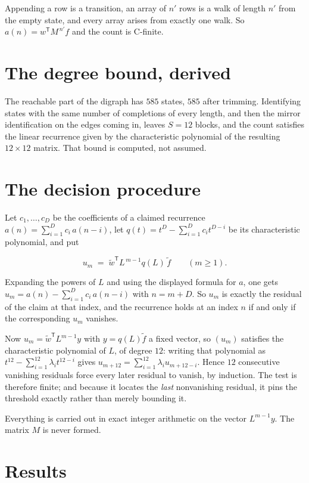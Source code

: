 \documentclass[11pt]{article}
\theoremstyle{definition}
\begin{document}
Appending a row is a transition, an array of $n'$ rows is a walk of length $n'$ from the empty state, and every array arises from exactly one walk. So $a(n) = w^{\mathsf T}M^{\,n'}f$ and the count is C-finite.

\section{The degree bound, derived}

The reachable part of the digraph has $585$ states, $585$ after trimming. Identifying states with the same number of completions of every length, and then the mirror identification on the edges coming in, leaves $S = 12$ blocks, and the count satisfies the linear recurrence given by the characteristic polynomial of the resulting $12\times12$ matrix. That bound is computed, not assumed.

\section{The decision procedure}

Let $c_1,\dots,c_D$ be the coefficients of a claimed recurrence $a(n) = \sum_{i=1}^{D} c_i\,a(n-i)$, let $q(t) = t^{D} - \sum_{i=1}^{D} c_i t^{D-i}$ be its characteristic polynomial, and put

\[u_m \;=\; \tilde w^{\mathsf T} L^{\,m-1} q(L)\,\tilde f \qquad (m \ge 1).\]

Expanding the powers of $L$ and using the displayed formula for $a$, one gets $u_m = a(n) - \sum_{i=1}^{D} c_i\,a(n-i)$ with $n = m + D$. So $u_m$ is exactly the residual of the claim at that index, and the recurrence holds at an index $n$ if and only if the corresponding $u_m$ vanishes.

Now $u_m = \tilde w^{\mathsf T} L^{m-1} y$ with $y = q(L)\tilde f$ a fixed vector, so $(u_m)$ satisfies the characteristic polynomial of $L$, of degree $12$: writing that polynomial as $t^{12} - \sum_{i=1}^{12} \lambda_i t^{12-i}$ gives $u_{m+12} = \sum_{i=1}^{12} \lambda_i u_{m+12-i}$. Hence $12$ consecutive vanishing residuals force every later residual to vanish, by induction. The test is therefore finite; and because it locates the {\itshape last} nonvanishing residual, it pins the threshold exactly rather than merely bounding it.

Everything is carried out in exact integer arithmetic on the vector $L^{m-1}y$. The matrix $M$ is never formed.

\section{Results}
\end{document}
